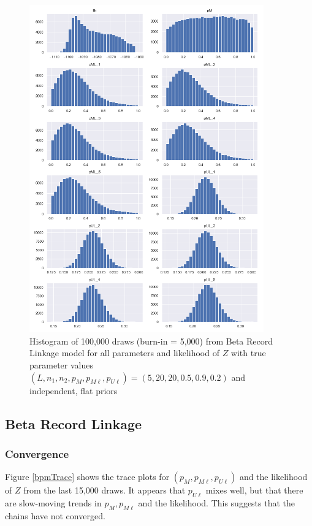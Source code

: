 \documentclass[11pt,reqno]{amsart}
\newcommand\params{(p_M, p_{M\ell}, p_{U\ell})}
\begin{document}
\begin{figure}[h!]
\begin{center}
\includegraphics[width=0.9\textwidth]{../Figures/bpm/nM10/allParam_nM10_L5.png}
\caption{Histogram of 100,000 draws (burn-in = 5,000) from Beta Record Linkage model for all parameters and likelihood of $Z$ with true parameter values $(L, n_1, n_2, p_M, p_{M\ell}, p_{U\ell}) = (5, 20, 20, 0.5, 0.9, 0.2)$ and independent, flat priors}
\label{bpmLarge}
\end{center}
\end{figure}

\subsection{Beta Record Linkage}
\subsubsection{Convergence}  Figure \ref{bpmTrace} shows the trace plots for $\params$ and the likelihood of $Z$ from the last 15,000 draws.  It appears that $p_{U\ell}$ mixes well, but that there are slow-moving trends in $p_M, p_{M\ell}$ and the likelihood.  This suggests that the chains have not converged. 
\end{document}
